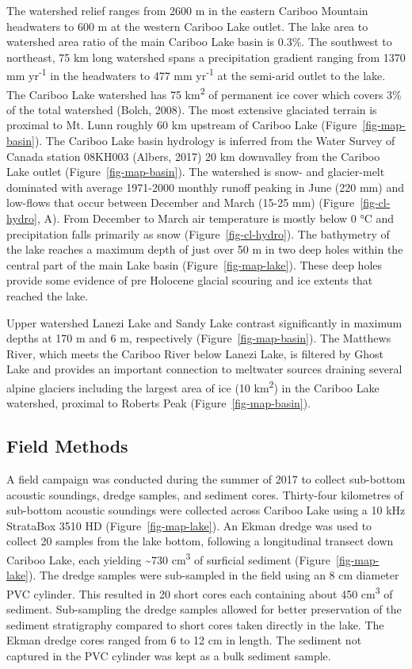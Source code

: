 \documentclass[
  letterpaper,
  DIV=11,
  numbers=noendperiod]{scrartcl}
\begin{document}
The watershed relief ranges from 2600 m in the eastern Cariboo Mountain
headwaters to 600 m at the western Cariboo Lake outlet. The lake area to
watershed area ratio of the main Cariboo Lake basin is 0.3\%. The
southwest to northeast, 75 km long watershed spans a precipitation
gradient ranging from 1370 mm yr\textsuperscript{-1} in the headwaters
to 477 mm yr\textsuperscript{-1} at the semi-arid outlet to the lake.
The Cariboo Lake watershed has 75 km\textsuperscript{2} of permanent ice
cover which covers 3\% of the total watershed (Bolch, 2008). The most
extensive glaciated terrain is proximal to Mt. Lunn roughly 60 km
upstream of Cariboo Lake (Figure~\ref{fig-map-basin}). The Cariboo Lake
basin hydrology is inferred from the Water Survey of Canada station
08KH003 (Albers, 2017) 20 km downvalley from the Cariboo Lake outlet
(Figure~\ref{fig-map-basin}). The watershed is snow- and glacier-melt
dominated with average 1971-2000 monthly runoff peaking in June (220 mm)
and low-flows that occur between December and March (15-25 mm)
(Figure~\ref{fig-cl-hydro}, A). From December to March air temperature
is mostly below 0 °C and precipitation falls primarily as snow
(Figure~\ref{fig-cl-hydro}). The bathymetry of the lake reaches a
maximum depth of just over 50 m in two deep holes within the central
part of the main Lake basin (Figure~\ref{fig-map-lake}). These deep
holes provide some evidence of pre Holocene glacial scouring and ice
extents that reached the lake.

Upper watershed Lanezi Lake and Sandy Lake contrast significantly in
maximum depths at 170 m and 6 m, respectively
(Figure~\ref{fig-map-basin}). The Matthews River, which meets the
Cariboo River below Lanezi Lake, is filtered by Ghost Lake and provides
an important connection to meltwater sources draining several alpine
glaciers including the largest area of ice (10 km\textsuperscript{2}) in
the Cariboo Lake watershed, proximal to Roberts Peak
(Figure~\ref{fig-map-basin}).

\hypertarget{field-methods}{%
\subsection{Field Methods}\label{field-methods}}

A field campaign was conducted during the summer of 2017 to collect
sub-bottom acoustic soundings, dredge samples, and sediment cores.
Thirty-four kilometres of sub-bottom acoustic soundings were collected
across Cariboo Lake using a 10 kHz StrataBox 3510 HD
(Figure~\ref{fig-map-lake}). An Ekman dredge was used to collect 20
samples from the lake bottom, following a longitudinal transect down
Cariboo Lake, each yielding \textasciitilde730 cm\textsuperscript{3} of
surficial sediment (Figure~\ref{fig-map-lake}). The dredge samples were
sub-sampled in the field using an 8 cm diameter PVC cylinder. This
resulted in 20 short cores each containing about 450
cm\textsuperscript{3} of sediment. Sub-sampling the dredge samples
allowed for better preservation of the sediment stratigraphy compared to
short cores taken directly in the lake. The Ekman dredge cores ranged
from 6 to 12 cm in length. The sediment not captured in the PVC cylinder
was kept as a bulk sediment sample.
\end{document}
